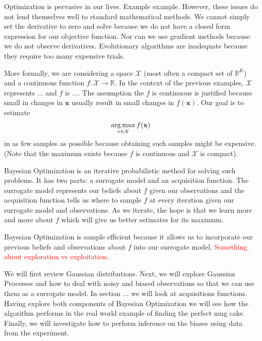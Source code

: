 Optimization is pervasive in our lives.
Example example.
However, these issues do not lend themselves well to standard mathematical methods.
We cannot simply set the derivative to zero and solve because we do not have a closed form expression for our objective function.
Nor can we use gradient methods because we do not observe derivatives.
Evolutionary algorithms are inadequate because they require too many expensive trials.

More formally, we are considering a space $\mathcal{X}$ (most often a compact set of $\mathbb{R}^{K}$) and a continuous function $f: \mathcal{X} \to \mathbb{R}$.
In the context of the previous examples, $\mathcal{X}$ represents ... and $f$ is ....
The assumption the $f$ is continuous is justified because small in changes in $\mathbf{x}$ usually result in small changes in $f(\mathbf{x})$.
Our goal is to estimate
\begin{equation*}
    \operatorname*{arg\,max}_{x \in \mathcal{X}} f(\mathbf{x})
\end{equation*}
in as few samples as possible because obtaining such samples might be expensive. (Note that the maximum exists because $f$ is continuous and $\mathcal{X}$ is compact).

Bayesian Optimization is an iterative probabilistic method for solving such problems.
It has two parts: a surrogate model and an acquisition function.
The surrogate model represents our beliefs about $f$ given our observations
and the acquisition function tells us where to sample $f$ at every iteration given our surrogate model and observations.
As we iterate, the hope is that we learn more and more about $f$ which will give us better estimates for its maximum.

Bayesian Optimization is sample efficient because it allows us to incorporate our previous beliefs and observations about $f$ into our surrogate model.
\textcolor{red}{Something about exploration vs exploitation.}

We will first review Gaussian distributions.
Next, we will explore Gaussian Processes and how to deal with noisy and biased observations
so that we can use them as a surrogate model.
In section ... we will look at acquisitions functions.
Having explore both components of Bayesian Optimization we will see how the algorithm performs in the real world example of finding the perfect mug cake.
Finally, we will investigate how to perform inference on the biases using data from the experiment.
